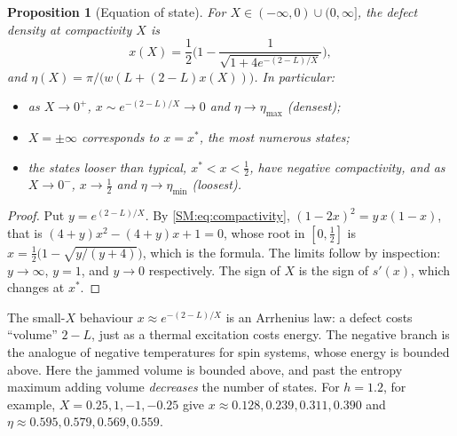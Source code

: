 \documentclass[11pt,openany]{book}
\theoremstyle{plain}
\newtheorem{proposition}[theorem]{Proposition}
\theoremstyle{definition}
\theoremstyle{remark}
\begin{document}
\begin{proposition}[Equation of state]\label{SM:prop:eos}
For $X\in(-\infty,0)\cup(0,\infty]$, the defect density at compactivity $X$ is
\[
  x(X)=\frac12\Big(1-\frac1{\sqrt{1+4e^{-(2-L)/X}}}\Big),
\]
and $\eta(X)=\pi/\big(w(L+(2-L)x(X))\big)$. In particular:
\begin{itemize}[nosep]
\item as $X\to0^+$, $x\sim e^{-(2-L)/X}\to0$ and $\eta\to\eta_{\max}$ (densest);
\item $X=\pm\infty$ corresponds to $x=x^*$, the most numerous states;
\item the states looser than typical, $x^*<x<\frac12$, have \emph{negative} compactivity, and as $X\to0^-$,
  $x\to\frac12$ and $\eta\to\eta_{\min}$ (loosest).
\end{itemize}
\end{proposition}

\begin{proof}
Put $y=e^{(2-L)/X}$. By \eqref{SM:eq:compactivity}, $(1-2x)^2=y\,x(1-x)$, that is
$(4+y)x^2-(4+y)x+1=0$, whose root in $[0,\frac12]$ is $x=\frac12\big(1-\sqrt{y/(y+4)}\big)$, which is the
formula. The limits follow by inspection: $y\to\infty$, $y=1$, and $y\to0$ respectively. The sign of
$X$ is the sign of $s'(x)$, which changes at $x^*$.
\end{proof}

The small-$X$ behaviour $x\approx e^{-(2-L)/X}$ is an Arrhenius law: a defect costs ``volume'' $2-L$,
just as a thermal excitation costs energy. The negative branch is the analogue of negative temperatures
for spin systems, whose energy is bounded above. Here the jammed volume is bounded above, and past the
entropy maximum adding volume \emph{decreases} the number of states. For $h=1.2$, for example,
$X=0.25,1,-1,-0.25$ give $x\approx0.128,0.239,0.311,0.390$ and $\eta\approx0.595,0.579,0.569,0.559$.
\end{document}
